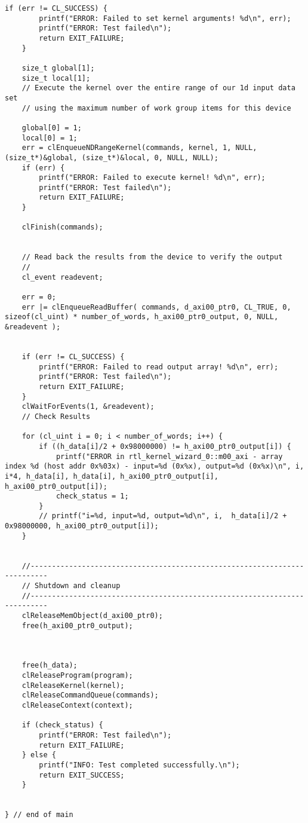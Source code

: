 \begin{lstlisting}[label=code:hostexample3, caption=Содержимое файла host\_example.cpp, basicstyle=\tiny]
    if (err != CL_SUCCESS) {
        printf("ERROR: Failed to set kernel arguments! %d\n", err);
        printf("ERROR: Test failed\n");
        return EXIT_FAILURE;
    }

    size_t global[1];
    size_t local[1];
    // Execute the kernel over the entire range of our 1d input data set
    // using the maximum number of work group items for this device

    global[0] = 1;
    local[0] = 1;
    err = clEnqueueNDRangeKernel(commands, kernel, 1, NULL, (size_t*)&global, (size_t*)&local, 0, NULL, NULL);
    if (err) {
        printf("ERROR: Failed to execute kernel! %d\n", err);
        printf("ERROR: Test failed\n");
        return EXIT_FAILURE;
    }

    clFinish(commands);


    // Read back the results from the device to verify the output
    //
    cl_event readevent;

    err = 0;
    err |= clEnqueueReadBuffer( commands, d_axi00_ptr0, CL_TRUE, 0, sizeof(cl_uint) * number_of_words, h_axi00_ptr0_output, 0, NULL, &readevent );


    if (err != CL_SUCCESS) {
        printf("ERROR: Failed to read output array! %d\n", err);
        printf("ERROR: Test failed\n");
        return EXIT_FAILURE;
    }
    clWaitForEvents(1, &readevent);
    // Check Results

    for (cl_uint i = 0; i < number_of_words; i++) {
        if ((h_data[i]/2 + 0x98000000) != h_axi00_ptr0_output[i]) {
            printf("ERROR in rtl_kernel_wizard_0::m00_axi - array index %d (host addr 0x%03x) - input=%d (0x%x), output=%d (0x%x)\n", i, i*4, h_data[i], h_data[i], h_axi00_ptr0_output[i], h_axi00_ptr0_output[i]);
            check_status = 1;
        }
        // printf("i=%d, input=%d, output=%d\n", i,  h_data[i]/2 + 0x98000000, h_axi00_ptr0_output[i]);
    }


    //--------------------------------------------------------------------------
    // Shutdown and cleanup
    //-------------------------------------------------------------------------- 
    clReleaseMemObject(d_axi00_ptr0);
    free(h_axi00_ptr0_output);



    free(h_data);
    clReleaseProgram(program);
    clReleaseKernel(kernel);
    clReleaseCommandQueue(commands);
    clReleaseContext(context);

    if (check_status) {
        printf("ERROR: Test failed\n");
        return EXIT_FAILURE;
    } else {
        printf("INFO: Test completed successfully.\n");
        return EXIT_SUCCESS;
    }


} // end of main
\end{lstlisting}

